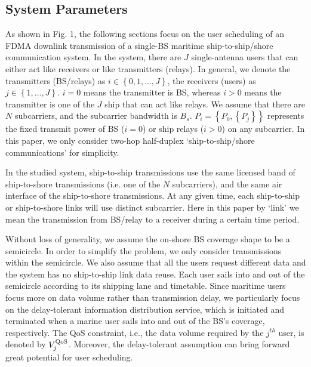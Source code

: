 \documentclass[conference]{IEEEtran}
\begin{document}
 
 \subsection{System Parameters}
 
 As shown in Fig. 1, the following sections focus on the user scheduling of an FDMA downlink transmission of a single-BS maritime ship-to-ship/shore communication system. In the system, there are $J$ single-antenna users that can either act like receivers or like transmitters (relays). In general, we denote the transmitters (BS/relays) as $i \in \left\{ {0,1,...,J} \right\}$, the receivers (users) as $j \in \left\{ {1,...,J} \right\}$. $i=0$ means the transmitter is BS, whereas $i>0$ means the transmitter is one of the $J$ ship that can act like relays. We assume that there are $N$ subcarriers, and the subcarrier bandwidth is ${B_s}$. $P_i = \left\{ {P_0,\left\{ {P_j} \right\}} \right\}$ represents the fixed transmit power of BS ($i=0$) or ship relays ($i>0$) on any subcarrier. In this paper, we only consider two-hop half-duplex `ship-to-ship/shore communications' for simplicity. 
 
 In the studied system, ship-to-ship transmissions use the same licensed band of ship-to-shore transmissions (i.e. one of the $N$ subcarriers), and the same air interface of the ship-to-shore transmissions. 
 At any given time, each ship-to-ship or ship-to-shore links will use distinct subcarrier. Here in this paper by `link' we mean the transmission from BS/relay to a receiver during a certain time period. 
 
 Without loss of generality, we assume the on-shore BS coverage shape to be a semicircle. 
 In order to simplify the problem, we only consider transmissions within the semicircle. We also assume that all the users request different data and the system has no ship-to-ship link data reuse. 
 Each user sails into and out of the semicircle according to its shipping lane and timetable. 
 Since maritime users focus more on data volume rather than transmission delay, we particularly focus on the delay-tolerant information distribution service, which is initiated and terminated when a marine user sails into and out of the BS's coverage, respectively. 
 The QoS constraint, i.e., the data volume required by the ${j^{th}}$ user, is denoted by $V_j^{\rm{QoS}}$. Moreover, the delay-tolerant assumption can bring forward great potential for user scheduling. 
 
\end{document}

